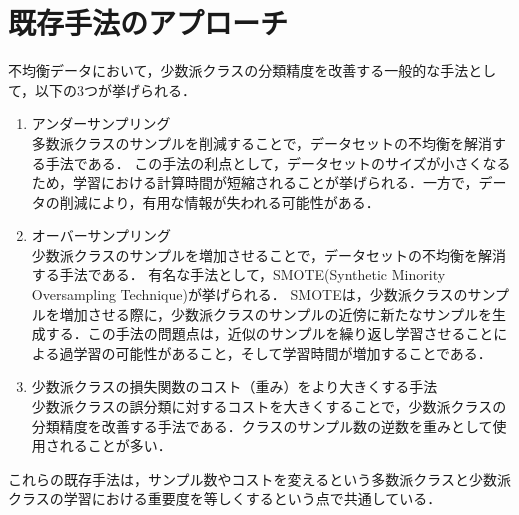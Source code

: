 \section{既存手法のアプローチ}

不均衡データにおいて，少数派クラスの分類精度を改善する一般的な手法として，以下の3つが挙げられる．

\begin{enumerate}
    \item アンダーサンプリング \\
    多数派クラスのサンプルを削減することで，データセットの不均衡を解消する手法である．
    この手法の利点として，データセットのサイズが小さくなるため，学習における計算時間が短縮されることが挙げられる．一方で，データの削減により，有用な情報が失われる可能性がある．
    \item オーバーサンプリング\\
    少数派クラスのサンプルを増加させることで，データセットの不均衡を解消する手法である．
    有名な手法として，SMOTE(Synthetic Minority Oversampling Technique)\cite{smote}が挙げられる．
    SMOTEは，少数派クラスのサンプルを増加させる際に，少数派クラスのサンプルの近傍に新たなサンプルを生成する．この手法の問題点は，近似のサンプルを繰り返し学習させることによる過学習の可能性があること，そして学習時間が増加することである．
    \item 少数派クラスの損失関数のコスト（重み）をより大きくする手法\\
    少数派クラスの誤分類に対するコストを大きくすることで，少数派クラスの分類精度を改善する手法である．クラスのサンプル数の逆数を重みとして使用されることが多い．
\end{enumerate}

これらの既存手法は，サンプル数やコストを変えるという多数派クラスと少数派クラスの学習における重要度を等しくするという点で共通している．